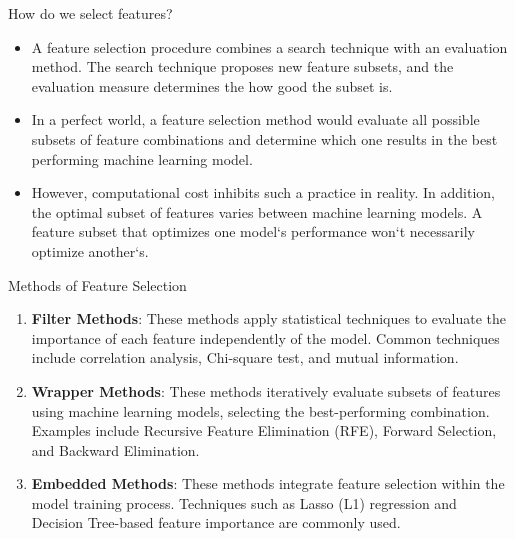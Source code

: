 \documentclass[11pt]{beamer}
\begin{document}
\begin{frame}{How do we select features? }
	\begin{itemize}
		\item A feature selection procedure combines a search technique with an evaluation method. The search technique proposes new feature subsets, and the evaluation measure determines the how good the subset is.
		\item In a perfect world, a feature selection method would evaluate all possible subsets of feature combinations and determine which one results in the best performing machine learning model.
		\item However, computational cost inhibits such a practice in reality. In addition, the optimal subset of features varies between machine learning models. A feature subset that optimizes one model`s performance won`t necessarily optimize another`s.
	\end{itemize}
\end{frame}

\begin{frame}{Methods of Feature Selection}
    \begin{enumerate}
        \item \textbf{Filter Methods}: These methods apply statistical techniques to evaluate the importance of each feature independently of the model. Common techniques include correlation analysis, Chi-square test, and mutual information.
        \item \textbf{Wrapper Methods}: These methods iteratively evaluate subsets of features using machine learning models, selecting the best-performing combination. Examples include Recursive Feature Elimination (RFE), Forward Selection, and Backward Elimination.
        \item \textbf{Embedded Methods}: These methods integrate feature selection within the model training process. Techniques such as Lasso (L1) regression and Decision Tree-based feature importance are commonly used.
    \end{enumerate}
\end{frame}
\end{document}
